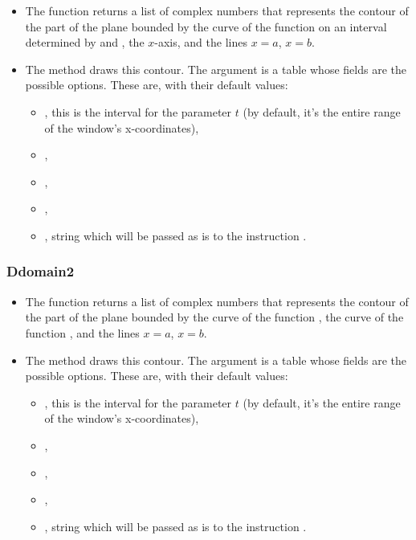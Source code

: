 \begin{itemize}
    \item The function  returns a list of complex numbers that represents the contour of the part of the plane bounded by the curve of the function  on an interval determined by  and , the $x$-axis, and the lines \(x=a\), \(x=b\).

    \item The method  draws this contour. The argument  is a table whose fields are the possible options. These are, with their default values:

    \begin{itemize}
        \item {}, this is the interval for the parameter $t$ (by default, it's the entire range of the window's x-coordinates),
        \item {}, 
        \item {},
        \item {},
        \item {}, string which will be passed as is to the instruction \drawcmd.
\end{itemize}
\end{itemize}

\subsubsection{Ddomain2}

\begin{itemize}
    \item The  function returns a list of complex numbers that represents the contour of the part of the plane bounded by the curve of the function , the curve of the function , and the lines \(x=a\), \(x=b\).

    \item The  method draws this contour. The argument  is a table whose fields are the possible options. These are, with their default values:

    \begin{itemize}
        \item {}, this is the interval for the parameter $t$ (by default, it's the entire range of the window's x-coordinates),
        \item {}, 
        \item {},
        \item {},
        \item {}, string which will be passed as is to the instruction \drawcmd.
\end{itemize}
\end{itemize}

